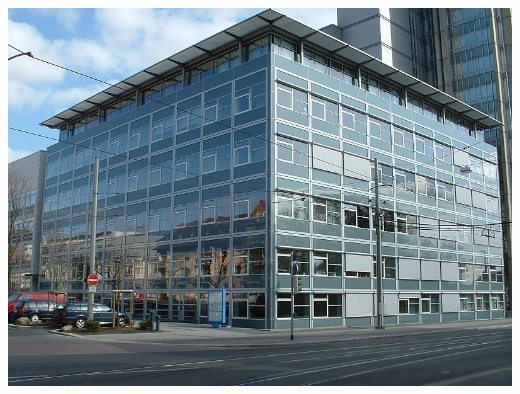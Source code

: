 \documentclass[a4paper,bcor=0mm,9pt,parskip=full,twoside]{tubsartcl}
\begin{document}
\begin{gaussbox}[bgcolor=tubsBlue20,padding=minimal]{5}{3}{2}{1}
\includegraphics{infozentrum}
\end{gaussbox}
%
\begin{gaussbox}[fgcolor=tuRed]{2}{4}{5}{2}
\raggedright\sffamily
\lipsum[1]
\end{gaussbox}
\clearpage
\end{document}
